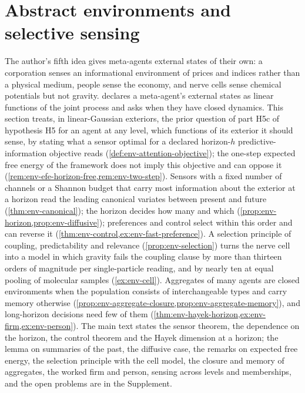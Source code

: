 \section{Abstract environments and selective sensing}\label{sec:env}

The author's fifth idea gives meta-agents external states of their own: a corporation senses an informational environment of prices and indices rather than a physical medium, people sense the economy, and nerve cells sense chemical potentials but not gravity.  declares a meta-agent's external states as linear functions of the joint process and asks when they have closed dynamics. This section treats, in linear-Gaussian exteriors, the prior question of part H5c of hypothesis H5 for an agent at any level, which functions of its exterior it should sense, by stating what a sensor optimal for a declared horizon-$h$ predictive-information objective reads (\cref{def:env-attention-objective}); the one-step expected free energy of the framework does not imply this objective and can oppose it (\cref{rem:env-efe-horizon-free,rem:env-two-step}). Sensors with a fixed number of channels or a Shannon budget that carry most information about the exterior at a horizon read the leading canonical variates between present and future (\cref{thm:env-canonical}); the horizon decides how many and which (\cref{prop:env-horizon,prop:env-diffusive}); preferences and control select within this order and can reverse it (\cref{thm:env-control,ex:env-fast-preference}). A selection principle of coupling, predictability and relevance (\cref{prop:env-selection}) turns the nerve cell into a model in which gravity fails the coupling clause by more than thirteen orders of magnitude per single-particle reading, and by nearly ten at equal pooling of molecular samples (\cref{ex:env-cell}). Aggregates of many agents are closed environments when the population consists of interchangeable types and carry memory otherwise (\cref{prop:env-aggregate-closure,prop:env-aggregate-memory}), and long-horizon decisions need few of them (\cref{thm:env-hayek-horizon,ex:env-firm,ex:env-person}). The main text states the sensor theorem, the dependence on the horizon, the control theorem and the Hayek dimension at a horizon; the lemma on summaries of the past, the diffusive case, the remarks on expected free energy, the selection principle with the cell model, the closure and memory of aggregates, the worked firm and person, sensing across levels and memberships, and the open problems are in the Supplement.

